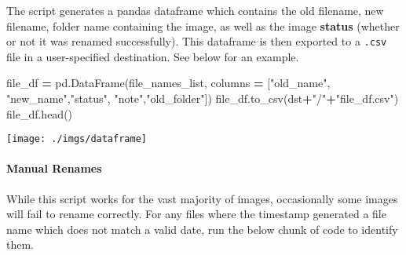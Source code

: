 \documentclass[
]{article}
\newenvironment{Shaded}{\begin{snugshade}}{\end{snugshade}}
\newcommand{\NormalTok}[1]{#1}
\newcommand{\OperatorTok}[1]{\textcolor[rgb]{0.81,0.36,0.00}{\textbf{#1}}}
\newcommand{\StringTok}[1]{\textcolor[rgb]{0.31,0.60,0.02}{#1}}
\begin{document}
The script generates a pandas dataframe which contains the old filename,
new filename, folder name containing the image, as well as the image \textbf{status} (whether or not it was renamed successfully). This dataframe is then exported to a \texttt{.csv} file in a user-specified destination. See below for an example.

\begin{Shaded}
\begin{Highlighting}[]
\NormalTok{file\_df }\OperatorTok{=}\NormalTok{ pd.DataFrame(file\_names\_list, columns }\OperatorTok{=}\NormalTok{ [}\StringTok{"old\_name"}\NormalTok{, }\StringTok{"new\_name"}\NormalTok{,}\StringTok{"status"}\NormalTok{, }\StringTok{"note"}\NormalTok{,}\StringTok{"old\_folder"}\NormalTok{])}
\NormalTok{file\_df.to\_csv(dst}\OperatorTok{+}\StringTok{"/"}\OperatorTok{+}\StringTok{"file\_df.csv"}\NormalTok{)}
\NormalTok{file\_df.head()}
\end{Highlighting}
\end{Shaded}

\texttt{[image: ./imgs/dataframe]}

\hypertarget{manual-renames}{%
\paragraph{Manual Renames}\label{manual-renames}}

While this script works for the vast majority of images, occasionally some images
will fail to rename correctly. For any files where the timestamp generated a file name which does not match a valid date, run the below chunk of code to identify them.
\end{document}
